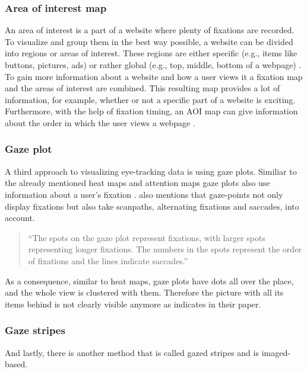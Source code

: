 \subsubsection{Area of interest map}
An area of interest is a part of a website where plenty of fixations are recorded. To visualize and group them in the best way possible, a website can be divided into regions or areas of interest. These regions are either specific (e.g., items like buttons, pictures, ads) or rather global (e.g., top, middle, bottom of a webpage) \autocite[]{gonzalez2011different, djamasbi2014eye}. To gain more information about a website and how a user views it a fixation map and the areas of interest are combined. This resulting map provides a lot of information, for example, whether or not a specific part of a website is exciting. Furthermore, with the help of fixation timing, an AOI map can give information about the order in which the user views a webpage \autocite[]{djamasbi2014eye}.

\subsubsection{Gaze plot}
A third approach to visualizing eye-tracking data is using gaze plots. Similiar to the already mentioned heat maps and attention maps gaze plots also use information about a user's fixation \autocite[]{kurzhals2016gaze}. \textcite[]{kurzhals2016gaze} also mentions that gaze-points not only display fixations but also take scanpaths, alternating fixations and saccades, into account. 

\begin{quote}
``The spots on the gaze plot represent fixations, with larger spots representing longer fixations. The numbers in the spots represent the order of fixations and the lines indicate saccades.''
\autocite[]{djamasbi2014eye}
\end{quote}

As a consequence, similar to heat maps, gaze plots have dots all over the place, and the whole view is clustered with them. Therefore the picture with all its items behind is not clearly visible anymore as \textcite[]{djamasbi2014eye} indicates in their paper.

\subsubsection{Gaze stripes}
And lastly, there is another method that is called gazed stripes and is imaged-based.

